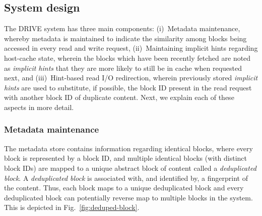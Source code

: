 \subsection{System design}
\label{sec:drivechap-system-design}
The DRIVE system has three main components: (i)~Metadata maintenance,
whereby metadata 
is maintained to indicate the similarity among blocks being 
accessed in every read and write request, 
(ii)~Maintaining implicit hints regarding host-cache state, wherein the 
blocks which have been recently fetched are noted as \textit{implicit hints} 
that they are more likely to still be in cache when requested next, and
(iii)~Hint-based read I/O redirection, wherein previously stored 
\textit{implicit hints} are used to substitute, if possible, the block 
ID present in the read request with another block ID of duplicate content.
Next, we explain each of these aspects in more detail.

\subsubsection{Metadata maintenance}
The metadata store contains information regarding identical blocks,
where every block is represented by a block ID, and multiple identical
blocks (with distinct block IDs) are mapped to a unique abstract block
of content called a \textit{deduplicated block}.
A \textit{deduplicated block} is
associated with, and identified by, a fingerprint of the content.
Thus, each block maps to a unique deduplicated block and every
deduplicated block can potentially reverse map to multiple blocks
in the system. This is depicted in Fig.~\ref{fig:deduped-block}.

